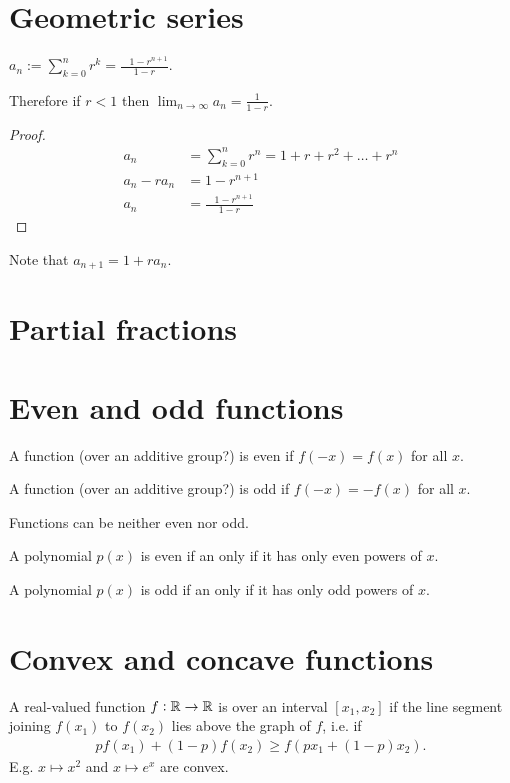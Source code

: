 \section{Geometric series}
\begin{theorem*}
  $a_n := \sum_{k=0}^nr^k = \frac{~~~~1 - r^{n+1}}{1 - r}$.

  Therefore if $r < 1$ then $\lim_{n \to \infty} a_n = \frac{1}{1 - r}$.
\end{theorem*}
\begin{proof}
  \begin{align*}
    a_n          &= \sum_{k=0}^nr^n = 1 + r + r^2 + \ldots + r^n\\
    a_n - ra_n  &= 1 - r^{n+1}\\
    a_n          &= \frac{~~~~1 - r^{n+1}}{1 - r}
  \end{align*}
\end{proof}
\begin{remark*}
  Note that $a_{n+1} = 1 + ra_n$.
\end{remark*}

\section{Partial fractions}


\section{Even and odd functions}

\begin{definition*}
  A function (over an additive group?) is even if $f(-x) = f(x)$ for all $x$.

  A function (over an additive group?) is odd if $f(-x) = -f(x)$ for all $x$.
\end{definition*}

Functions can be neither even nor odd.

\begin{claim*}
  A polynomial $p(x)$ is even if an only if it has only even powers of $x$.

  A polynomial $p(x)$ is odd if an only if it has only odd powers of $x$.
\end{claim*}

\section{Convex and concave functions}\label{convexity}
A real-valued function $f:\mathbb{R}\to\mathbb{R}$ is  over an interval $[x_1, x_2]$ if the line
segment joining $f(x_1)$ to $f(x_2)$ lies above the graph of $f$, i.e. if
\begin{align*}
  pf(x_1) + (1-p)f(x_2) \geq f(px_1 + (1 - p)x_2).
\end{align*}
E.g. $x \mapsto x^2$ and $x \mapsto e^x$ are convex.

